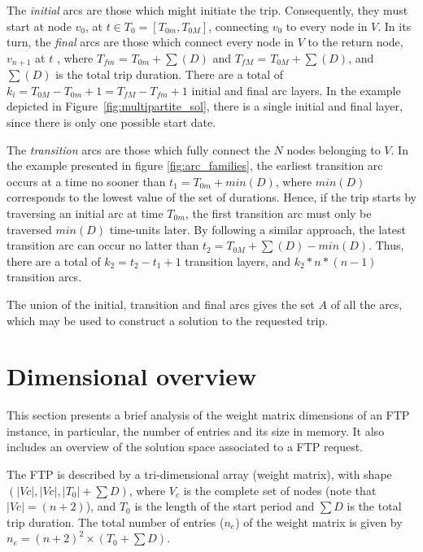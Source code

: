 The \textit{initial} arcs are those which might initiate the trip. Consequently, they must start at node $v_0$, at $t \in T_0 = [T_{0m}, T_{0M}]$, connecting $v_0$ to every node in $V$. In its turn, the \textit{final} arcs are those which connect every node in $V$ to the return node, $v_{n+1}$ at $t$ \in [$T_{fm}$, $T_{fM}$], where $T_{fm}$ = $T_{0m} + \sum(D)$ and $T_{fM}$ = $T_{0M} + \sum(D)$, and $\sum(D)$ is the total trip duration. There are a total of $k_i = T_{0M} - T_{0m} + 1 = T_{fM} -T_{fm} + 1$ initial and final arc layers. In the example depicted in Figure~\ref{fig:multipartite_sol}, there is a single initial and final layer, since there is only one possible start date.

The \textit{transition} arcs are those which fully connect the $N$ nodes belonging to $V$. In the example presented in figure \ref{fig:arc_families}, the earliest transition arc occurs at a time no sooner than $t_1 = T_{0m} + min(D)$, where $min(D)$ corresponds to the lowest value of the set of durations. Hence, if the trip starts by traversing an initial arc at time $T_{0m}$, the first transition arc must only be traversed $min(D)$ time-units later. By following a similar approach, the latest transition arc can occur no latter than $t_2 = T_{0M} + \sum(D) - min(D)$. Thus, there are a total of $k_2 = t_2-t_1+1$ transition layers, and $k_2*n*(n-1)$ transition arcs.

The union of the initial, transition and final arcs gives the set $A$ of all the arcs, which may be used to construct a solution to the requested trip. 







\section{Dimensional overview}
\label{sec:dimensions}

This section 
presents a brief analysis of the weight matrix dimensions of an FTP instance, in particular, the number of entries and its size in memory. It also includes an overview of the solution space associated to a FTP request. 

The FTP is described by a tri-dimensional array (weight matrix), with shape $(|Vc|,|Vc|, |T_{0}| + \sum D)$, where $V_c$ is the complete set of nodes (note that$|Vc|=(n+2)$), and $T_{0}$ is the length of the start period and $\sum D$ is the total trip duration. The total number of entries ($n_e$) of the weight matrix is given by $n_{e} = (n+2)^2\times(T_{0} + \sum D)$. 

